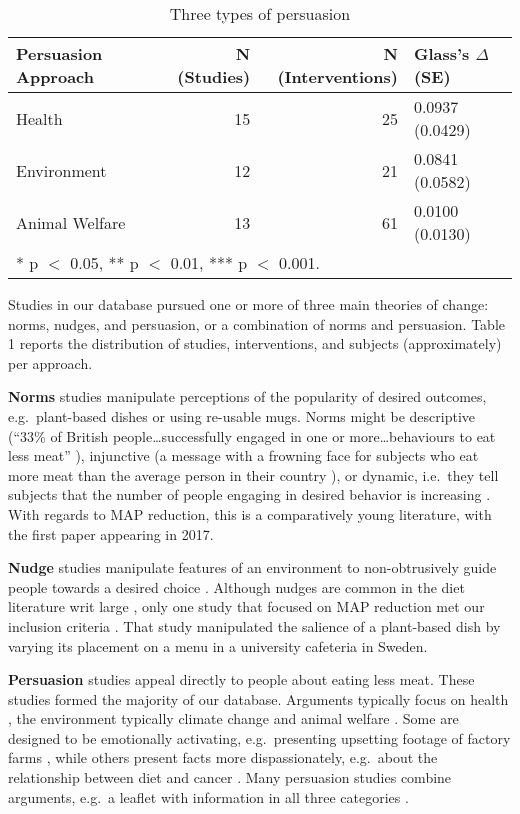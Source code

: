 \documentclass[sn-nature,pdflatex]{sn-jnl}
\begin{document}
\begin{table}[!h]
\centering
\caption{\label{tab:tab:table_two}Three types of persuasion}
\centering
\begin{tabular}[t]{lrrl}
\toprule
Persuasion Approach & N (Studies) & N (Interventions) & Glass's $\Delta$ (SE)\\
\midrule
Health & 15 & 25 & 0.0937 (0.0429)\\
Environment & 12 & 21 & 0.0841 (0.0582)\\
Animal Welfare & 13 & 61 & 0.0100 (0.0130)\\
\bottomrule
\multicolumn{4}{l}{\rule{0pt}{1em}* p $<$ 0.05, ** p $<$ 0.01, *** p $<$ 0.001.}\\
\end{tabular}
\end{table}

Studies in our database pursued one or more of three main theories of
change: norms, nudges, and persuasion, or a combination of norms and
persuasion. Table 1 reports the distribution of studies, interventions,
and subjects (approximately) per approach.

\textbf{Norms} studies manipulate perceptions of the popularity of
desired outcomes, e.g.~plant-based dishes \citep{sparkman2021} or using
re-usable mugs\citep{loschelder2019}. Norms might be descriptive (``33\%
of British people\ldots successfully engaged in one or
more\ldots behaviours to eat less meat'' \citep{aldoh2023}), injunctive
(a message with a frowning face for subjects who eat more meat than the
average person in their country \citep{alblas2023}), or dynamic,
i.e.~they tell subjects that the number of people engaging in desired
behavior is increasing
\citep{aldoh2023, coker2022, sparkman2017, sparkman2020, sparkman2021}.
With regards to MAP reduction, this is a comparatively young literature,
with the first paper appearing in 2017.

\textbf{Nudge} studies manipulate features of an environment to
non-obtrusively guide people towards a desired choice
\citep{thaler2009}. Although nudges are common in the diet literature
writ large \citep{olafsson2024, cadario2020, szaszi2018}, only one study
that focused on MAP reduction met our inclusion criteria
\citep{andersson2021}. That study manipulated the salience of a
plant-based dish by varying its placement on a menu in a university
cafeteria in Sweden.

\textbf{Persuasion} studies appeal directly to people about eating less
meat. These studies formed the majority of our database. Arguments
typically focus on health \citep{lacroix2020}, the environment
\citep{carfora2023} \textemdash typically climate change \textemdash and
animal welfare \citep{haile2021}. Some are designed to be emotionally
activating, e.g.~presenting upsetting footage of factory farms
\citep{bertolaso2015}, while others present facts more dispassionately,
e.g.~about the relationship between diet and cancer \citep{hatami2018}.
Many persuasion studies combine arguments, e.g.~a leaflet with
information in all three categories \citep{hennessy2016}.
\end{document}
